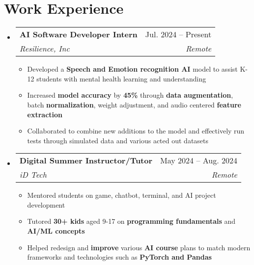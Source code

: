 \documentclass[letterpaper,11pt]{article}
\makeatletter
\newcommand{\resumeItem}[1]{
  \item\small{
    {#1 \vspace{-2pt}}
  }
}
\newcommand{\resumeSubheading}[4]{
  \vspace{-2pt}\item
    \begin{tabular*}{0.97\textwidth}[t]{l@{\extracolsep{\fill}}r}
      \textbf{#1} & #2 \\
      \textit{\small#3} & \textit{\small #4} \\
    \end{tabular*}\vspace{-7pt}
}
\newcommand{\resumeSubSubheading}[2]{
    \item
    \begin{tabular*}{0.97\textwidth}{l@{\extracolsep{\fill}}r}
      \textit{\small#1} & \textit{\small #2} \\
    \end{tabular*}\vspace{-7pt}
}
\newcommand{\resumeSubHeadingListStart}{\begin{itemize}[leftmargin=0.15in, label={}]}
\newcommand{\resumeSubHeadingListEnd}{\end{itemize}}
\newcommand{\resumeItemListStart}{\begin{itemize}}
\newcommand{\resumeItemListEnd}{\end{itemize}\vspace{-5pt}}
\makeatother
\begin{document}
\section{Work Experience}

  \resumeSubHeadingListStart
  
    \resumeSubheading
      {AI Software Developer Intern}{Jul. 2024 -- Present}
      {Resilience, Inc}{Remote}
      \resumeItemListStart
        \resumeItem{Developed a \textbf{Speech and Emotion recognition AI} model to assist K-12 students with mental health learning and understanding}
        \resumeItem{Increased \textbf{model accuracy} by \textbf{45\%} through \textbf{data augmentation}, batch \textbf{normalization}, weight adjustment, and audio centered \textbf{feature extraction}}
        \resumeItem{Collaborated to combine new additions to the model and effectively run tests through simulated data and various acted out datasets}
    \resumeItemListEnd

    \resumeSubheading
      {Digital Summer Instructor/Tutor}{May 2024 -- Aug. 2024}
      {iD Tech}{Remote}
      \resumeItemListStart
      \resumeItem{Mentored students on game, chatbot, terminal, and AI project development}
        \resumeItem{Tutored \textbf{30+ kids} aged 9-17 on \textbf{programming fundamentals} and \textbf{AI/ML concepts}}
        
        \resumeItem{Helped redesign and \textbf{improve} various \textbf{AI course} plans to match modern frameworks and technologies such as \textbf{PyTorch and Pandas}}
      \resumeItemListEnd
      
    


  \resumeSubHeadingListEnd


\end{document}
